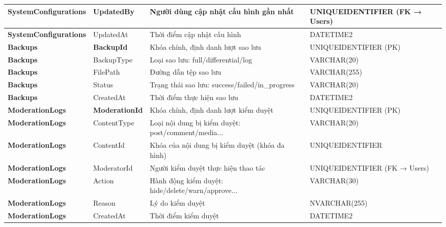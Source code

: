 \begin{longtable}{|p{}|p{}|p{}|p{}|}
\textbf{SystemConfigurations} & UpdatedBy & Người dùng cập nhật cấu hình gần nhất & UNIQUEIDENTIFIER (FK → Users) \\ \hline
\textbf{SystemConfigurations} & UpdatedAt & Thời điểm cập nhật cấu hình & DATETIME2 \\ \hline
\textbf{Backups} & \textbf{BackupId} & Khóa chính, định danh lượt sao lưu & UNIQUEIDENTIFIER (PK) \\ \hline
\textbf{Backups} & BackupType & Loại sao lưu: full/differential/log & VARCHAR(20) \\ \hline
\textbf{Backups} & FilePath & Đường dẫn tệp sao lưu & VARCHAR(255) \\ \hline
\textbf{Backups} & Status & Trạng thái sao lưu: success/failed/in\_progress & VARCHAR(20) \\ \hline
\textbf{Backups} & CreatedAt & Thời điểm thực hiện sao lưu & DATETIME2 \\ \hline
\textbf{ModerationLogs} & \textbf{ModerationId} & Khóa chính, định danh lượt kiểm duyệt & UNIQUEIDENTIFIER (PK) \\ \hline
\textbf{ModerationLogs} & ContentType & Loại nội dung bị kiểm duyệt: post/comment/media... & VARCHAR(20) \\ \hline
\textbf{ModerationLogs} & ContentId & Khóa của nội dung bị kiểm duyệt (khóa đa hình) & UNIQUEIDENTIFIER \\ \hline
\textbf{ModerationLogs} & ModeratorId & Người kiểm duyệt thực hiện thao tác & UNIQUEIDENTIFIER (FK → Users) \\ \hline
\textbf{ModerationLogs} & Action & Hành động kiểm duyệt: hide/delete/warn/approve... & VARCHAR(30) \\ \hline
\textbf{ModerationLogs} & Reason & Lý do kiểm duyệt & NVARCHAR(255) \\ \hline
\textbf{ModerationLogs} & CreatedAt & Thời điểm kiểm duyệt & DATETIME2 \\ \hline
\end{longtable}
